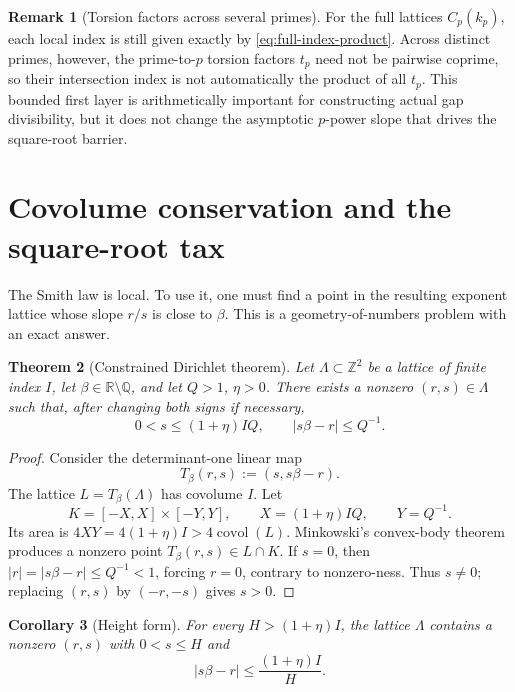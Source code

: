 \documentclass[11pt,oneside]{article}
\newtheorem{theorem}{Theorem}[section]
\newtheorem{corollary}[theorem]{Corollary}
\theoremstyle{definition}
\newtheorem{remark}[theorem]{Remark}
\newcommand{\Q}{\mathbb{Q}}
\newcommand{\Z}{\mathbb{Z}}
\newcommand{\R}{\mathbb{R}}
\newcommand{\covol}{\operatorname{covol}}
\begin{document}
\begin{remark}[Torsion factors across several primes]
For the full lattices $C_p(k_p)$, each local index is still given exactly
by \eqref{eq:full-index-product}.  Across distinct primes, however, the
prime-to-$p$ torsion factors $t_p$ need not be pairwise coprime, so their
intersection index is not automatically the product of all $t_p$.  This
bounded first layer is arithmetically important for constructing actual
gap divisibility, but it does not change the asymptotic $p$-power slope
that drives the square-root barrier.
\end{remark}

\section{Covolume conservation and the square-root tax}
\label{sec:minkowski}

The Smith law is local.  To use it, one must find a point in the resulting
exponent lattice whose slope $r/s$ is close to $\beta$.  This is a
geometry-of-numbers problem with an exact answer.

\begin{theorem}[Constrained Dirichlet theorem]\label{thm:constrained-dirichlet}
Let $\Lambda\subset\Z^2$ be a lattice of finite index $I$, let
$\beta\in\R\setminus\Q$, and let $Q>1$, $\eta>0$.  There exists a nonzero
$(r,s)\in\Lambda$ such that, after changing both signs if necessary,
\begin{equation}\label{eq:constrained-dirichlet}
  0<s\le(1+\eta)IQ,
  \qquad
  |s\beta-r|\le Q^{-1}.
\end{equation}
\end{theorem}

\begin{proof}
Consider the determinant-one linear map
\begin{equation}\label{eq:Tbeta}
  T_\beta(r,s):=(s,s\beta-r).
\end{equation}
The lattice $L=T_\beta(\Lambda)$ has covolume $I$.  Let
\[
  K=[-X,X]\times[-Y,Y],
  \qquad
  X=(1+\eta)IQ,
  \qquad
  Y=Q^{-1}.
\]
Its area is $4XY=4(1+\eta)I>4\covol(L)$.  Minkowski's convex-body theorem
produces a nonzero point $T_\beta(r,s)\in L\cap K$.  If $s=0$, then
$|r|=|s\beta-r|\le Q^{-1}<1$, forcing $r=0$, contrary to nonzero-ness.
Thus $s\ne0$; replacing $(r,s)$ by $(-r,-s)$ gives $s>0$.
\end{proof}

\begin{corollary}[Height form]\label{cor:height-form}
For every $H>(1+\eta)I$, the lattice $\Lambda$ contains a nonzero
$(r,s)$ with $0<s\le H$ and
\begin{equation}\label{eq:error-index-height}
  |s\beta-r|
  \le\frac{(1+\eta)I}{H}.
\end{equation}
\end{corollary}
\end{document}
